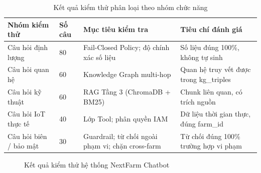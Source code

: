 \begin{table}[H]
\caption{Kết quả kiểm thử phân loại theo nhóm chức năng}
\label{tab:ket-qua-test}
\centering
\begin{tabular}{|p{4cm}|p{2cm}|p{4.5cm}|p{3cm}|}
\hline
\textbf{Nhóm kiểm thử} & \textbf{Số câu} & \textbf{Mục tiêu kiểm tra} & \textbf{Tiêu chí đánh giá} \\
\hline
Câu hỏi định lượng & 80 & Fail-Closed Policy; độ chính xác số liệu & Số liệu đúng 100\%, không tự sinh \\
\hline
Câu hỏi quan hệ & 60 & Knowledge Graph multi-hop & Quan hệ truy vết được trong kg\_triples \\
\hline
Câu hỏi kỹ thuật & 60 & RAG Tầng 3 (ChromaDB + BM25) & Chunk liên quan, có trích nguồn \\
\hline
Câu hỏi IoT thực tế & 40 & Lớp Tool; phân quyền IAM & Dữ liệu thời gian thực, đúng farm\_id \\
\hline
Câu hỏi biên / bảo mật & 30 & Guardrail; từ chối ngoài phạm vi; chặn cross-farm & Từ chối đúng 100\% trường hợp vi phạm \\
\hline
\end{tabular}
\end{table}


\begin{figure}[H]
    \centering
    \caption{Kết quả kiểm thử hệ thống NextFarm Chatbot}
    \label{fig:benchmark-results}
\end{figure}


